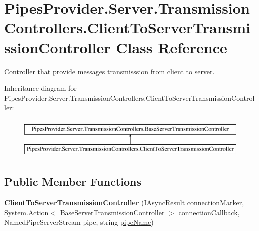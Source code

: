 \hypertarget{class_pipes_provider_1_1_server_1_1_transmission_controllers_1_1_client_to_server_transmission_controller}{}\section{Pipes\+Provider.\+Server.\+Transmission\+Controllers.\+Client\+To\+Server\+Transmission\+Controller Class Reference}
\label{class_pipes_provider_1_1_server_1_1_transmission_controllers_1_1_client_to_server_transmission_controller}


Controller that provide message\textquotesingle{}s transmisssion from client to server.  


Inheritance diagram for Pipes\+Provider.\+Server.\+Transmission\+Controllers.\+Client\+To\+Server\+Transmission\+Controller\+:\begin{figure}[H]
\begin{center}
\leavevmode
\includegraphics[height=2.000000cm]{dc/ddf/class_pipes_provider_1_1_server_1_1_transmission_controllers_1_1_client_to_server_transmission_controller}
\end{center}
\end{figure}
\subsection*{Public Member Functions}
\begin{DoxyCompactItemize}
\item 
\mbox{\label{class_pipes_provider_1_1_server_1_1_transmission_controllers_1_1_client_to_server_transmission_controller_a74769635feb16e48b0885fac6ee29909}} 
{\bfseries Client\+To\+Server\+Transmission\+Controller} (I\+Async\+Result \mbox{\hyperlink{class_pipes_provider_1_1_server_1_1_transmission_controllers_1_1_base_server_transmission_controller_afc45a2287e6fef24892a0aee8aa86f56}{connection\+Marker}}, System.\+Action$<$ \mbox{\hyperlink{class_pipes_provider_1_1_server_1_1_transmission_controllers_1_1_base_server_transmission_controller}{Base\+Server\+Transmission\+Controller}} $>$ \mbox{\hyperlink{class_pipes_provider_1_1_server_1_1_transmission_controllers_1_1_base_server_transmission_controller_a632261255d8dfc87d93445180c6e2c9d}{connection\+Callback}}, Named\+Pipe\+Server\+Stream pipe, string \mbox{\hyperlink{class_pipes_provider_1_1_server_1_1_transmission_controllers_1_1_base_server_transmission_controller_a4ce9911f1ad6814d3e5c9096d9ddde57}{pipe\+Name}})
\end{DoxyCompactItemize}
